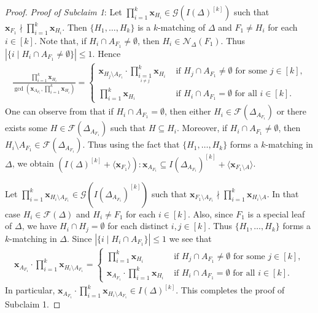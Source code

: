 \documentclass[12pt,a4paper,reqno]{amsart}
\theoremstyle{definition}
\def\G{\mathcal{G}}
\def\F{\mathcal{F}}
\def\N{\mathcal{N}}
\def\l{\langle}
\def\r{\rangle}
\def\x{\mathbf x}
\begin{document}
\begin{proof}
\noindent
\textit{Proof of Subclaim 1}: Let $\prod_{i=1}^k\x_{H_i}\in \G(I(\Delta)^{[k]})$ such that $\x_{F_1}\nmid \prod_{i=1}^k\x_{H_i}$. Then $\{H_1,\ldots,H_k\}$ is a $k$-matching of $\Delta$ and $F_1\neq H_i$ for each $i\in[k]$. Note that, if $H_i\cap A_{F_1}\neq\emptyset$, then $H_i\in \N_{\Delta}(F_1)$. Thus $|\{i\mid H_i\cap A_{F_1}\neq\emptyset\}|\le 1$. Hence
\begin{align*}
     \frac{\prod_{i=1}^k\x_{H_i}}{\gcd(\x_{A_{F_1}}, \prod_{i=1}^k\x_{H_i})}=\begin{cases}
         \x_{H_j\setminus A_{F_1}}\cdot \prod_{\underset{i\neq j}{i=1}}^k\x_{H_i}&\text{ if }H_j\cap {A_{F_1}}\neq\emptyset\text{ for some }j\in[k],\\
         \prod_{i=1}^k\x_{H_i}&\text{ if }H_i\cap A_{F_1}=\emptyset\text{ for all }i\in[k].
     \end{cases}  
    \end{align*}
  One can observe from  that if $H_i\cap A_{F_1}=\emptyset$, then either $H_i\in \F(\Delta_{A_{F_1}})$ or there exists some $H\in \F(\Delta_{A_{F_1}})$ such that $H\subseteq H_i$. Moreover, if $H_i\cap A_{F_1}\neq\emptyset$, then $H_i\setminus A_{F_1}\in\F(\Delta_{A_{F_1}})$. Thus using the fact that $\{H_1,\ldots,H_k\}$ forms a $k$-matching in $\Delta$, we obtain $(I(\Delta)^{[k]}+\l \x_{F_1}\r):\x_{A_{F_1}}\subseteq I(\Delta_{A_{F_1}})^{[k]}+\l\x_{F_1\setminus A}\r$. 

  Let $\prod_{i=1}^k\x_{H_i\setminus A_{F_1}}\in \G(I(\Delta_{A_{F_1}})^{[k]})$ such that $\x_{F_1\setminus A_{F_1}}\nmid \prod_{i=1}^k\x_{H_i\setminus A}$. In that case $H_i\in\F(\Delta)$ and $H_i\neq F_1$ for each $i\in [k]$. Also, since $F_1$ is a special leaf of $\Delta$, we have $H_i\cap H_j=\emptyset$ for each distinct $i,j\in[k]$. Thus $\{H_1,\ldots,H_k\}$ forms a $k$-matching in $\Delta$. Since $|\{i\mid H_i\cap A_{F_1}\}|\le 1$ we see that 
  \begin{align*}
      \x_{A_{F_1}}\cdot\prod_{i=1}^k\x_{H_i\setminus A_{F_1}}=\begin{cases}
          \prod_{i=1}^k\x_{H_i}&\text{ if }H_j\cap {A_{F_1}}\neq\emptyset\text{ for some }j\in[k],\\
          \x_{A_{F_1}}\cdot \prod_{i=1}^k\x_{H_i}&\text{ if }H_i\cap A_{F_1}=\emptyset\text{ for all }i\in[k].
      \end{cases}
  \end{align*}
  In particular, $\x_{A_{F_1}}\cdot\prod_{i=1}^k\x_{H_i\setminus A_{F_1}}\in I(\Delta)^{[k]}$. This completes the proof of Subclaim 1.


\end{proof}
\end{document}
